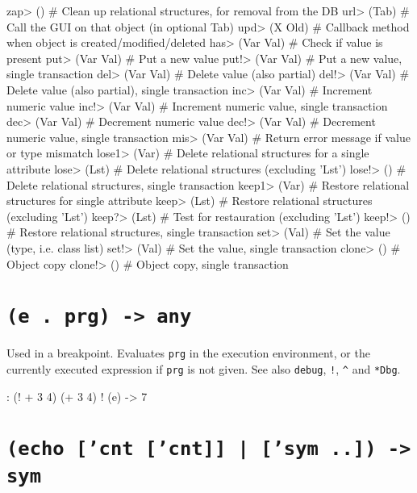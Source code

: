 \begin{wideverbatim}
zap> ()              # Clean up relational structures, for removal from the DB
url> (Tab)           # Call the GUI on that object (in optional Tab)
upd> (X Old)         # Callback method when object is created/modified/deleted
has> (Var Val)       # Check if value is present
put> (Var Val)       # Put a new value
put!> (Var Val)      # Put a new value, single transaction
del> (Var Val)       # Delete value (also partial)
del!> (Var Val)      # Delete value (also partial), single transaction
inc> (Var Val)       # Increment numeric value
inc!> (Var Val)      # Increment numeric value, single transaction
dec> (Var Val)       # Decrement numeric value
dec!> (Var Val)      # Decrement numeric value, single transaction
mis> (Var Val)       # Return error message if value or type mismatch
lose1> (Var)         # Delete relational structures for a single attribute
lose> (Lst)          # Delete relational structures (excluding 'Lst')
lose!> ()            # Delete relational structures, single transaction
keep1> (Var)         # Restore relational structures for single attribute
keep> (Lst)          # Restore relational structures (excluding 'Lst')
keep?> (Lst)         # Test for restauration (excluding 'Lst')
keep!> ()            # Restore relational structures, single transaction
set> (Val)           # Set the value (type, i.e. class list)
set!> (Val)          # Set the value, single transaction
clone> ()            # Object copy
clone!> ()           # Object copy, single transaction
\end{wideverbatim}

 
\section*{\texttt{(e . prg) -> any}}
\label{sec:func-ref-E-(e . prg) -> any}


Used in a breakpoint. Evaluates \texttt{prg} in the execution environment, or
the currently executed expression if \texttt{prg} is not given. See also
\texttt{debug}, \texttt{!}, \texttt{\textasciicircum{}} and \texttt{*Dbg}.


\begin{wideverbatim}
: (! + 3 4)
(+ 3 4)
! (e)
-> 7
\end{wideverbatim}

 
\section*{\texttt{(echo ['cnt ['cnt]] | ['sym ..]) -> sym}}
\label{sec:func-ref-E-(echo ['cnt ['cnt]] | ['sym ..]) -> sym}


